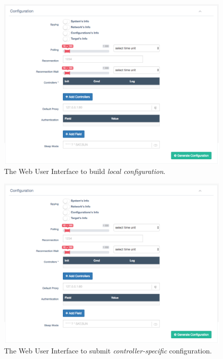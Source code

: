 \begin{figure}[h]
  \centering
  \includegraphics[scale=0.45]{./fig/configurationWUI.png}
  \caption{The Web User Interface to build \textit{local configuration}.}
    \label{fig:configuration-wui}
\end{figure}

\begin{figure}[h]
	\centering
	\includegraphics[scale=0.45]{./fig/configurationWUI.png}
	\caption{The Web User Interface to submit \textit{controller-specific} configuration.}
	\label{fig:initialization-wui}
\end{figure}
